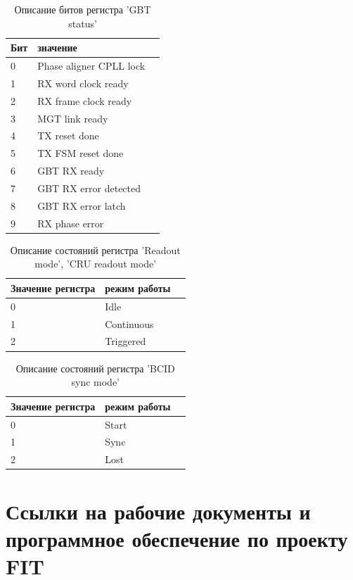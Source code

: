 \documentclass{article}
\begin{document}
\begin{table}[H]
\centering
\begin{tabular}{| l | l | l |}
\hline
Бит & значение \\ \hline
0 & Phase aligner CPLL lock \\ \hline
1 & RX word clock ready \\ \hline
2 & RX frame clock ready \\ \hline
3 & MGT link ready \\ \hline
4 & TX reset done \\ \hline
5 & TX FSM reset done \\ \hline
6 & GBT RX ready \\ \hline
7 & GBT RX error detected \\ \hline
8 & GBT RX error latch \\ \hline
9 & RX phase error \\ \hline
\end{tabular}
\caption{Описание битов регистра 'GBT status'\label{tab10}}
\end{table}




\begin{table}[H]
\centering
\begin{tabular}{| l | l | l |}
\hline
Значение регистра & режим работы \\ \hline
0 & Idle \\ \hline
1 & Continuous \\ \hline
2 & Triggered \\ \hline
\end{tabular}
\caption{Описание состояний регистра 'Readout mode', 'CRU readout mode'\label{tab11}}
\end{table}



\begin{table}[H]
\centering
\begin{tabular}{| l | l | l |}
\hline
Значение регистра & режим работы \\ \hline
0 & Start \\ \hline
1 & Sync \\ \hline
2 & Lost \\ \hline
\end{tabular}
\caption{Описание состояний регистра 'BCID sync mode'\label{tab12}}
\end{table}



\section{Ссылки на рабочие документы и программное обеспечение по проекту FIT}
\end{document}
